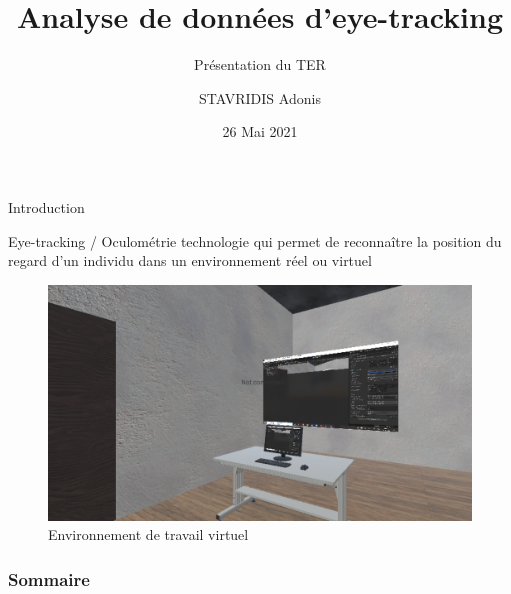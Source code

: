 \documentclass{beamer}
\title[Analyse de données d'eye-tracking]{Analyse de données d'eye-tracking}
\subtitle{Présentation du TER}
\author[STAVRIDIS Adonis]{STAVRIDIS Adonis}
\institute[Unistra, iCube]{
  Université de Strasbourg \and iCube
}
\date[TER]{26 Mai 2021}
\begin{document}
\frame{\titlepage}
\begin{frame}{Introduction}
  \begin{block}{Eye-tracking / Oculométrie}
    technologie qui permet de reconnaître la position du regard d’un individu
    dans un environnement réel ou virtuel
  \end{block}
  \pause
  \begin{figure}
    \includegraphics[height=0.35\textwidth]{environnement.png}
    \caption{Environnement de travail virtuel}
  \end{figure}
\end{frame}
\begin{frame}
  \frametitle{Sommaire}
  \tableofcontents
\end{frame}
\end{document}
